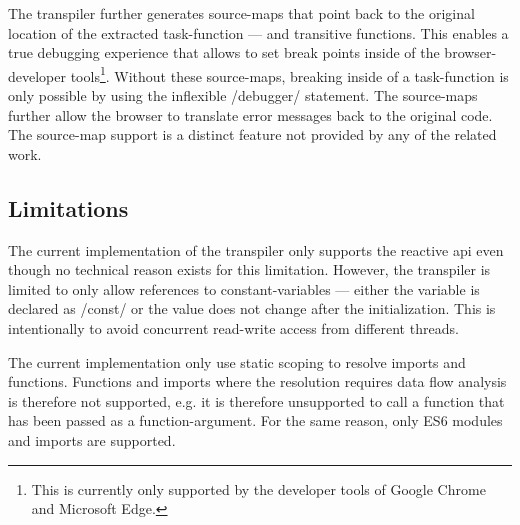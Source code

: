 The transpiler further generates source-maps that point back to the original location of the extracted task-function --- and transitive functions. This enables a true debugging experience that allows to set break points inside of the browser-developer tools\footnote{This is currently only supported by the developer tools of Google Chrome and Microsoft Edge.}. Without these source-maps, breaking inside of a task-function is only possible by using the inflexible \javascriptinline/debugger/ statement. The source-maps further allow the browser to translate error messages back to the original code. The source-map support is a distinct feature not provided by any of the related work.

\subsection{Limitations}
The current implementation of the transpiler only supports the reactive api even though no technical reason exists for this limitation. However, the transpiler is limited to only allow references to constant-variables --- either the variable is declared as \javascriptinline/const/ or the value does not change after the initialization. This is intentionally to avoid concurrent read-write access from different threads. 

The current implementation only use static scoping to resolve imports and functions. Functions and imports where the resolution requires data flow analysis is therefore not supported, e.g. it is therefore unsupported to call a function that has been passed as a function-argument. For the same reason, only ES6 modules and imports are supported.
